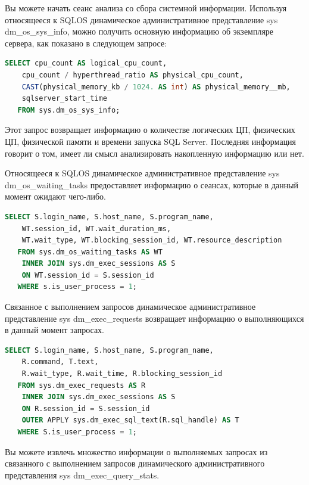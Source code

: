 Вы можете начать сеанс анализа со сбора системной информации. Используя относящееся к SQLOS динамическое административное представление sys dm\_os\_sys\_info, можно получить основную информацию об экземпляре сервера, как показано
в следующем запросе: 


\begin{lstlisting}[label=lst:funcReturn, language=sql]
	SELECT cpu_count AS logical_cpu_count,
	cpu_count / hyperthread_ratio AS physical_cpu_count,
	CAST(physical_memory_kb / 1024. AS int) AS physical_memory__mb,
	sqlserver_start_time
   FROM sys.dm_os_sys_info; 
\end{lstlisting}

Этот запрос возвращает информацию о количестве логических ЦП, физических
ЦП, физической памяти и времени запуска SQL Server. Последняя информация говорит о том, имеет ли смысл анализировать накопленную информацию или нет. 

Относящееся к SQLOS динамическое административное представление
sys dm\_os\_waiting\_tasks предоставляет информацию о сеансах, которые в данный
момент ожидают чего-либо.

\begin{lstlisting}[label=lst:funcReturn, language=sql]
	SELECT S.login_name, S.host_name, S.program_name,
	WT.session_id, WT.wait_duration_ms,
	WT.wait_type, WT.blocking_session_id, WT.resource_description
   FROM sys.dm_os_waiting_tasks AS WT
	INNER JOIN sys.dm_exec_sessions AS S
	ON WT.session_id = S.session_id
   WHERE s.is_user_process = 1; 
\end{lstlisting}

Связанное с выполнением запросов динамическое административное представление sys dm\_exec\_requests возвращает информацию о выполняющихся в данный момент запросах. 

\begin{lstlisting}[label=lst:funcReturn, language=sql]
	SELECT S.login_name, S.host_name, S.program_name,
	R.command, T.text,
	R.wait_type, R.wait_time, R.blocking_session_id
   FROM sys.dm_exec_requests AS R
	INNER JOIN sys.dm_exec_sessions AS S
	ON R.session_id = S.session_id
	OUTER APPLY sys.dm_exec_sql_text(R.sql_handle) AS T
   WHERE S.is_user_process = 1;
\end{lstlisting}


Вы можете извлечь множество информации о выполняемых запросах из связанного
с выполнением запросов динамического административного представления
sys dm\_exec\_query\_stats.


